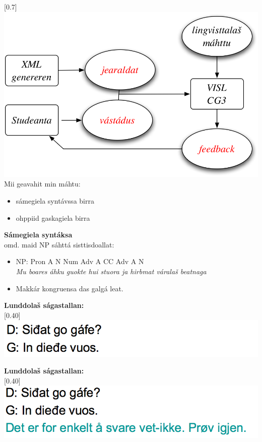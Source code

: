 \documentclass[landscape,norsk,11pt]{seminar}
\begin{document}
\begin{slide}
\scalebox{0.7}[0.7]{\includegraphics{img/skovi.png}} 
\newslide
Mii geavahit min máhtu:
\begin{itemize}
\item sámegiela syntávssa birra		
\item ohppiid gaskagiela birra
\end{itemize}

\newslide
\textbf{Sámegiela syntáksa}\\
omd. maid NP sáhttá sisttisdoallat:
\begin{itemize}
\item \small{NP: Pron A N Num Adv A CC Adv A N}  \\ 	
\textit{Mu boares áhku guokte hui stuora ja hirbmat váralaš beatnaga}	
\item Makkár kongruensa das galgá leat.
\end{itemize}



\newslide
\textbf{Lunddolaš ságastallan:} \\

\scalebox{0.40}[0.40]{\includegraphics{img/lgiella1.png}} 

\newslide
\textbf{Lunddolaš ságastallan:} \\

\scalebox{0.40}[0.40]{\includegraphics{img/lgiella2.png}} 


\end{slide}
\end{document}
